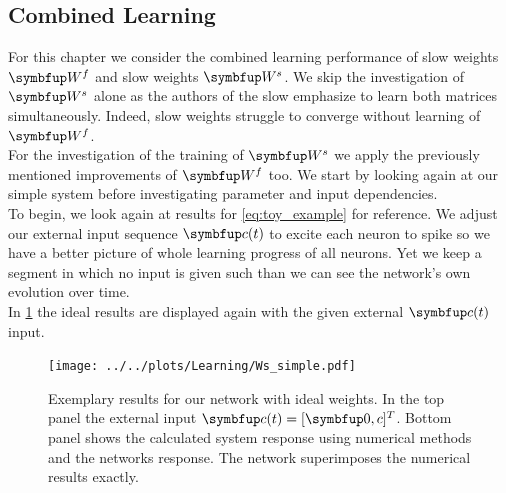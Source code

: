 \subsection{Combined Learning}\label{ssec:combined_learning}
For this chapter we consider the combined learning performance of slow weights $\bmu{W}^f$ and slow weights $\bmu{W}^s$. We skip the investigation of $\bmu{W}^s$ alone as the authors of the slow emphasize to learn both matrices simultaneously. Indeed, slow weights struggle to converge without learning of $\bmu{W}^f$.\\
For the investigation of the training of $\bmu{W}^s$ we apply the previously mentioned improvements of $\bmu{W}^f$ too. We start by looking again at our simple system before investigating parameter and input dependencies.\\
To begin, we look again at results for \cref{eq:toy_example} for reference. We adjust our external input sequence $\bmu{c}(t)$ to excite each neuron to spike so we have a better picture of whole learning progress of all neurons. Yet we keep a segment in which no input is given such than we can see the network's own evolution over time.\\
In \cref{fig:Ws_intro} the ideal results are displayed again with the given external $\bmu{c}(t)$ input.\\
\begin{figure}
	\centering
	\texttt{[image: ../../plots/Learning/Ws\_simple.pdf]}
	\caption{Exemplary results for our network with ideal weights. In the top panel the external input $\bmu{c}(t) = [\bmu{0},c]^T$. Bottom panel shows the calculated system response using numerical methods and the networks response. The network superimposes the numerical results exactly.}
	\label{fig:Ws_intro}
\end{figure}

